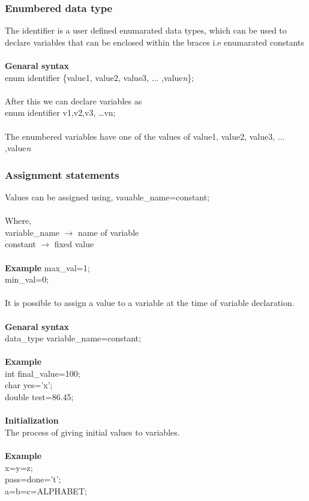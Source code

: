 \documentclass{article}
\begin{document}
	\subsubsection{Enumbered data type}
	The identifier is a user defined enumarated data types, which can be used to declare variables that can be enclosed within the braces i.e enumarated constants
	\\ \\
	\textbf{Genaral syntax} \\
	\tab \tab enum identifier \{value1, value2, value3, $\dots$ ,value\textit{n}\};
	\\ \\
	After this we can declare variables as \\
	\tab \tab enum identifier v1,v2,v3, \dots vn;
	\\ \\
	The enumbered variables have one of the values of value1, value2, value3, $\dots$ ,value\textit{n}
	
	\newpage
	
	\subsubsection{Assignment statements}
	Values can be assigned using,
	\tab \tab vauable\_name=constant;
	\\ \\
	Where, \\
	variable\_name $\rightarrow$ name of variable \\
	constant $\rightarrow$ fixed value 
	\\ \\
	\textbf{Example}
	max\_val=1; \\ min\_val=0;
	\\ \\
	It is possible to assign a value to a variable at the time of variable declaration.
	\\ \\
	\textbf{Genaral syntax} \\
	data\_type variable\_name=constant;
	\\ \\
	\textbf{Example} \\ 
	int final\_value=100; \\
	char yes='x'; \\
	double test=86.45;
	\\ \\
	\textbf{Initialization} \\
	The process of giving initial values to variables.
	\\ \\
	\textbf{Example} \\
	x=y=z; \\
	pass=done='t'; \\
	a=b=c=ALPHABET;
	
\end{document}
